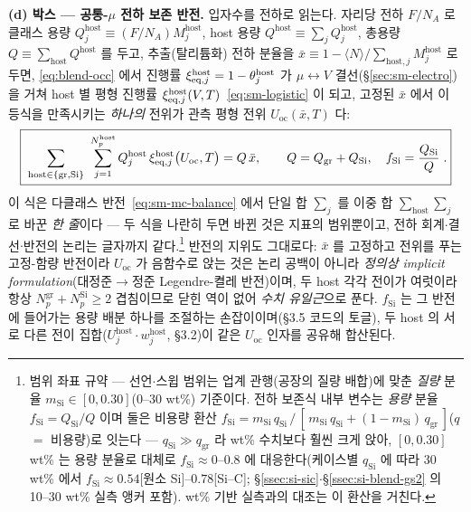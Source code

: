 \textbf{(d) 박스 --- 공통-$\mu$ 전하 보존 반전.} 입자수를 전하로 읽는다. 자리당 전하 $F/N_A$ 로 클래스
용량 $Q_j^\mathrm{host}\equiv(F/N_A)M_j^\mathrm{host}$, host 용량
$Q^\mathrm{host}\equiv\sum_jQ_j^\mathrm{host}$, 총용량 $Q\equiv\sum_\mathrm{host}Q^\mathrm{host}$ 를
두고, 추출(탈리튬화) 전하 분율을 $\bar x\equiv1-\langle N\rangle/\sum_{\mathrm{host},j}M_j^\mathrm{host}$
로 두면, \eqref{eq:blend-occ} 에서 진행률 $\xi_{\mathrm{eq},j}^\mathrm{host}=1-\theta_j^\mathrm{host}$ 가
$\mu\leftrightarrow V$ 결선(\S\ref{sec:sm-electro})을 거쳐 host 별 평형 진행률
$\xi_{\mathrm{eq},j}^\mathrm{host}(V,T)$~\eqref{eq:sm-logistic} 이 되고, 고정된 $\bar x$ 에서 이 등식을
만족시키는 \emph{하나의} 전위가 관측 평형 전위 $U_\mathrm{oc}(\bar x,T)$ 다:
\begin{equation}
\boxed{\;\sum_{\mathrm{host}\in\{\mathrm{gr},\mathrm{Si}\}}\ \sum_{j=1}^{N_p^\mathrm{host}}
Q_j^\mathrm{host}\,\xi_{\eq,j}^\mathrm{host}\bigl(U_\mathrm{oc},T\bigr)=Q\,\bar x,
\qquad
Q=Q_\mathrm{gr}+Q_\mathrm{Si},\quad f_\mathrm{Si}=\frac{Q_\mathrm{Si}}{Q}\;.}
\label{eq:blend-balance}
\end{equation}
이 식은 다클래스 반전~\eqref{eq:sm-mc-balance} 에서 단일 합 $\sum_j$ 를 이중 합
$\sum_\mathrm{host}\sum_j$ 로 바꾼 \emph{한 줄}이다 --- 두 식을 나란히 두면 바뀐 것은 지표의 범위뿐이고,
전하 회계$\cdot$결선$\cdot$반전의 논리는 글자까지 같다.\footnote{범위 좌표 규약 --- 선언$\cdot$스윕 범위는 업계 관행(공장의 질량 배합)에 맞춘 \emph{질량} 분율
$m_\mathrm{Si}\in[0,0.30]$(0--30 wt\%) 기준이다. 전하 보존식 내부 변수는 \emph{용량} 분율
$f_\mathrm{Si}=Q_\mathrm{Si}/Q$ 이며 둘은 비용량 환산
$f_\mathrm{Si}=m_\mathrm{Si}\,q_\mathrm{Si}\,/\,[\,m_\mathrm{Si}\,q_\mathrm{Si}+(1-m_\mathrm{Si})\,q_\mathrm{gr}\,]$($q$ $=$ 비용량)로
잇는다 --- $q_\mathrm{Si}\gg q_\mathrm{gr}$ 라 wt\% 수치보다 훨씬 크게 앉아, $[0,0.30]$ wt\% 는 용량 분율로
대체로 $f_\mathrm{Si}\approx0$--$0.8$ 에 대응한다(케이스별 $q_\mathrm{Si}$ 에 따라 30 wt\% 에서 $f_\mathrm{Si}{\approx}0.54$[원소 Si]--$0.78$[Si--C]; \S\ref{ssec:si-sic}$\cdot$\S\ref{ssec:si-blend-gs2} 의
10--30 wt\% 실측 앵커 포함). wt\% 기반 실측과의 대조는 이 환산을 거친다.} 반전의 지위도 그대로다: $\bar x$ 를 고정하고
전위를 푸는 고정-함량 반전이라 $U_\mathrm{oc}$ 가 음함수로 앉는 것은 논리 공백이 아니라 \emph{정의상
implicit formulation}(대정준$\to$정준 Legendre-켤레 반전)이며, 두 host 각각 전이가 여럿이라 항상
$N_p^\mathrm{gr}+N_p^\mathrm{Si}\ge2$ 겹침이므로 닫힌 역이 없어 \emph{수치 유일근}으로 푼다. $f_\mathrm{Si}$
는 그 반전에 들어가는 용량 배분 하나를 조절하는 손잡이이며(§3.5 코드의 토글), 두 host 의 서로 다른 전이
집합($U_j^\mathrm{host}\cdot w_j^\mathrm{host}$, §3.2)이 같은 $U_\mathrm{oc}$ 인자를 공유해 합산된다.
